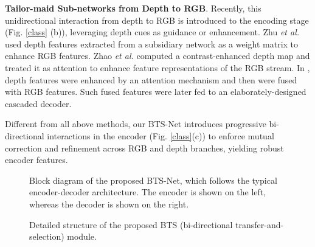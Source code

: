 \documentclass{article}
\begin{document}
\textbf{Tailor-maid Sub-networks from Depth to RGB}. Recently, this unidirectional interaction from depth to RGB is introduced to the encoding stage (Fig. \ref{class} (b)), leveraging depth cues as guidance or enhancement. Zhu \textit{et al.} \cite{PDNet} used depth features extracted from a subsidiary network as a weight matrix to enhance RGB features. Zhao \textit{et al.} \cite{CPFP} computed a contrast-enhanced depth map and treated it as attention to enhance feature representations of the RGB stream. In \cite{BBSNet}, depth features were enhanced by an attention mechanism and then were fused with RGB features. Such fused features were later fed to an elaborately-designed cascaded decoder.



Different from all above methods, our BTS-Net introduces progressive bi-directional interactions in the encoder (Fig. \ref{class}(c)) to enforce mutual correction and refinement across RGB and depth branches, yielding robust encoder features.








\begin{figure*}[htb]
  \centering
 \centerline{}\vspace{-0.4cm}
  \caption{Block diagram of the proposed BTS-Net, which follows the typical encoder-decoder architecture. The encoder is shown on the left, whereas the decoder is shown on the right.}\vspace{-0.3cm}
  \label{blockdiagram}
\end{figure*}

\begin{figure}[htb]
  \centering
\centerline{}\vspace{-0.3cm}
  \caption{Detailed structure of the proposed BTS (bi-directional transfer-and-selection) module.}\vspace{-0.3cm}
  \label{BTSdiagram}
\end{figure}
\end{document}
